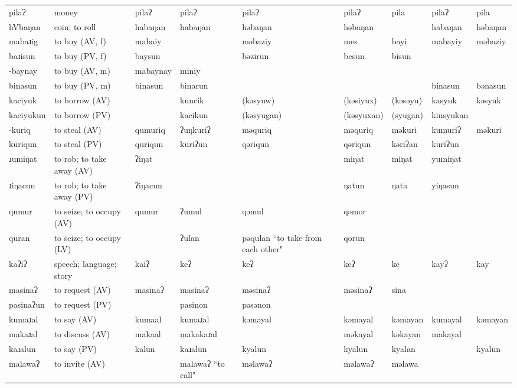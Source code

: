 \begin{landscape}
\begin{longtable}{*{9}{>{\raggedright\arraybackslash}p{}}}
\text{*}pilaʔ & money & pilaʔ & pilaʔ & pilaʔ & pilaʔ & pila & pilaʔ & pila\\
\text{*}hVbaŋan & coin; to roll & habaŋan & habaŋan & həbaŋan & həbaŋan &  & habaŋan & həbaŋan\\
\text{*}mabaɹig & to buy (AV, f) & mabaiy &  & məbaziy & mes & bayi & mabayiy & məbaziy\\
\text{*}baɹisun & to buy (PV, f) & baysun &  & bəzirun & besun & bisun &  & \\
\text{*}-baynay & to buy (AV, m) & mabaynay & miniy &  &  &  &  & \\
\text{*}binasun & to buy (PV, m) & binasun & binarun &  &  &  & binasun & bənasun\\
\text{*}kaciyuk & to borrow (AV) &  & kuncik & (kəsyuw) & (kəsiyux) & (kəsəyu) & kasyuk & kəsyuk\\
\text{*}kaciyukun & to borrow (PV) &  & kacikun & (kəsyugan) & (kəsyuxan) & (syugan) & kinsyukan & \\
\text{*}-kuriq & to steal (AV) & qumuriq & ʔuŋkuriʔ & məquriq & məquriq & məkuri & kumuriʔ & məkuri\\
\text{*}kuriqun & to steal (PV) & quriqun & kuriʔun & qəriqun & qəriqun & kəriʔan & kuriʔun & \\
\text{*}ɹumiŋat & to rob; to take away (AV) & ʔiŋat &  &  & miŋat & miŋat & yumiŋat & \\
\text{*}ɹiŋacun & to rob; to take away (PV) & ʔiŋacun &  &  & ŋatun & ŋata & yiŋasun & \\
\text{*}qumur & to seize; to occupy (AV) & qumur & ʔumul & qəmul & qəmor &  &  & \\
\text{*}quran & to seize; to occupy (LV) &  & ʔulan & pəqulan ``to take from each other" & qorun &  &  & \\
\text{*}kaʔiʔ & speech; language; story & kaiʔ & keʔ & keʔ & keʔ & ke & kayʔ & kay\\
\text{*}masinaʔ & to request (AV) & masinaʔ & masinaʔ & məsinaʔ & məsinaʔ & sina &  & \\
\text{*}pasinaʔun & to request (PV) &  & pasinon & pəsənon &  &  &  & \\
\text{*}kumaɹal & to say (AV) & kumaal & kumaɹal & kəmayal & kəmayal & kəmayan & kumayal & kəmayan\\
\text{*}makaɹal & to discuss (AV) & makaal & makakaɹal &  & məkayal & kəkayan & makayal & \\
\text{*}kaɹalun & to say (PV) & kalun & kaɹalun & kyalun & kyalun & kyalan &  & kyalun\\
\text{*}malawaʔ & to invite (AV) &  & malawaʔ ``to call" & məlawaʔ & məlawaʔ & məlawa &  & \\

\end{longtable}
\end{landscape}
